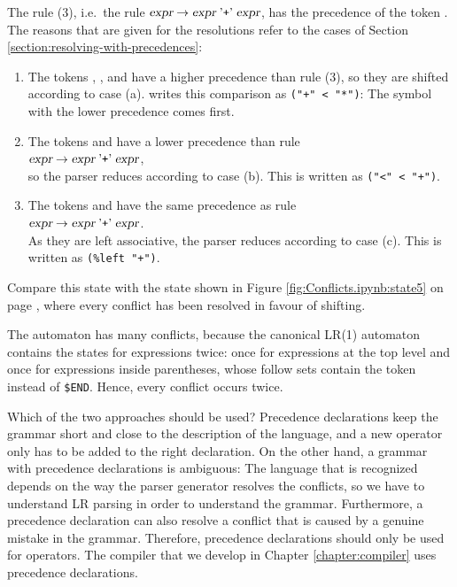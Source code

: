 \noindent
The rule (3), i.e.~the rule $\textsl{expr} \rightarrow \textsl{expr} \;\mbox{'\texttt{+}'}\; \textsl{expr}$, has the
precedence of the token \saquoted{+}.  The reasons that are given for the resolutions refer to the cases of
Section \ref{section:resolving-with-precedences}:
\begin{enumerate}
\item The tokens \saquoted{*}, \saquoted{/}, and  have a higher precedence than rule (3),
      so they are shifted according to case (a).   writes this comparison as
      \texttt{("+"~<~"*")}:  The symbol with the lower precedence comes first.
\item The tokens \saquoted{<} and \saquoted{==} have a lower precedence than rule
      \\[0.2cm]
      \hspace*{1.3cm}
      $\textsl{expr} \rightarrow \textsl{expr} \;\mbox{'\texttt{+}'}\; \textsl{expr}$,
      \\[0.2cm]
      so the parser reduces
      according to case (b).  This is written as \texttt{("<"~<~"+")}.
\item The tokens \saquoted{+} and \saquoted{-} have the same precedence as rule
      \\[0.2cm]
      \hspace*{1.3cm}
      $\textsl{expr} \rightarrow \textsl{expr} \;\mbox{'\texttt{+}'}\; \textsl{expr}$.
      \\[0.2cm]
      As they are left
      associative, the parser reduces according to case (c).  This is written as \texttt{(\%left~"+")}.
\end{enumerate}
Compare this state with the state shown in Figure \ref{fig:Conflicts.ipynb:state5} on page
\pageref{fig:Conflicts.ipynb:state5}, where every conflict has been resolved in favour of shifting.

The automaton has many conflicts, because the canonical LR(1) automaton contains the states for expressions
twice:  once for expressions at the top level and once for expressions inside parentheses, whose follow sets
contain the token \saquoted{)} instead of \texttt{\$END}.  Hence, every conflict occurs twice.

\remarkEng
Which of the two approaches should be used?  Precedence declarations keep the grammar short and close to the
description of the language, and a new operator only has to be added to the right declaration.  On the other
hand, a grammar with precedence declarations is ambiguous:  The language that is recognized depends on the way
the parser generator resolves the conflicts, so we have to understand LR parsing in order to understand the
grammar.  Furthermore, a precedence declaration can also resolve a conflict that is caused by a genuine mistake
in the grammar.  Therefore, precedence declarations should only be used for operators.  The compiler that we
develop in Chapter \ref{chapter:compiler} uses precedence declarations.
\eox

